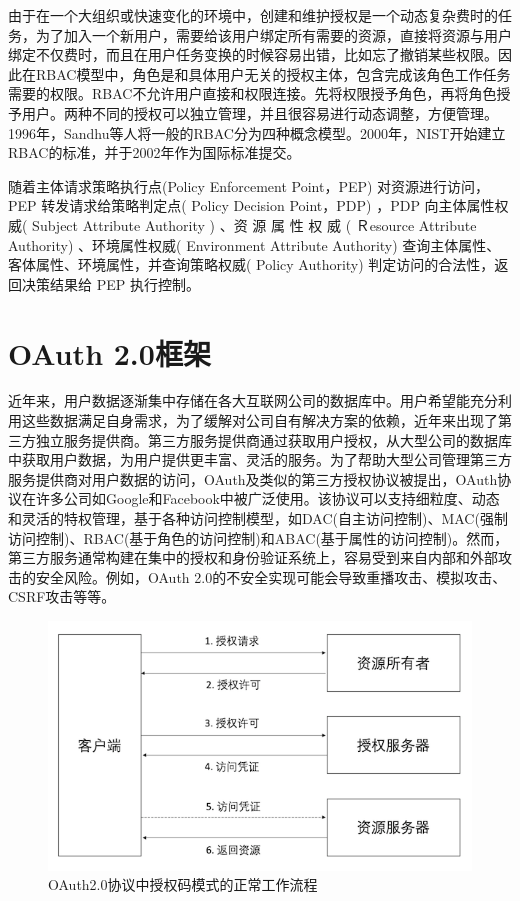由于在一个大组织或快速变化的环境中，创建和维护授权是一个动态复杂费时的任务，为了加入一个新用户，需要给该用户绑定所有需要的资源，直接将资源与用户绑定不仅费时，而且在用户任务变换的时候容易出错，比如忘了撤销某些权限。因此在RBAC模型中，角色是和具体用户无关的授权主体，包含完成该角色工作任务需要的权限。RBAC不允许用户直接和权限连接。先将权限授予角色，再将角色授予用户。两种不同的授权可以独立管理，并且很容易进行动态调整，方便管理。1996年，Sandhu等人将一般的RBAC分为四种概念模型。2000年，NIST开始建立RBAC的标准，并于2002年作为国际标准提交。

随着主体请求策略执行点(Policy Enforcement Point，PEP) 对资源进行访问，PEP 转发请求给策略判定点( Policy Decision Point，PDP) ，PDP 向主体属性权威( Subject Attribute Authority ) 、资 源 属 性 权 威 ( Ｒesource Attribute Authority) 、环境属性权威( Environment Attribute Authority) 查询主体属性、客体属性、环境属性，并查询策略权威( Policy Authority) 判定访问的合法性，返回决策结果给 PEP 执行控制。


\section{OAuth 2.0框架}

近年来，用户数据逐渐集中存储在各大互联网公司的数据库中。用户希望能充分利用这些数据满足自身需求，为了缓解对公司自有解决方案的依赖，近年来出现了第三方独立服务提供商。第三方服务提供商通过获取用户授权，从大型公司的数据库中获取用户数据，为用户提供更丰富、灵活的服务。为了帮助大型公司管理第三方服务提供商对用户数据的访问，OAuth及类似的第三方授权协议被提出，OAuth协议在许多公司如Google和Facebook中被广泛使用。该协议可以支持细粒度、动态和灵活的特权管理，基于各种访问控制模型，如DAC(自主访问控制)、MAC(强制访问控制)、RBAC(基于角色的访问控制)和ABAC(基于属性的访问控制)。然而，第三方服务通常构建在集中的授权和身份验证系统上，容易受到来自内部和外部攻击的安全风险。例如，OAuth 2.0的不安全实现可能会导致重播攻击、模拟攻击、CSRF攻击等等。

\begin{figure}
\centering  
\includegraphics [width=400pt]{figures/oauth.png}
\caption{OAuth2.0协议中授权码模式的正常工作流程}
\label{fig:oauth}
\end{figure}


